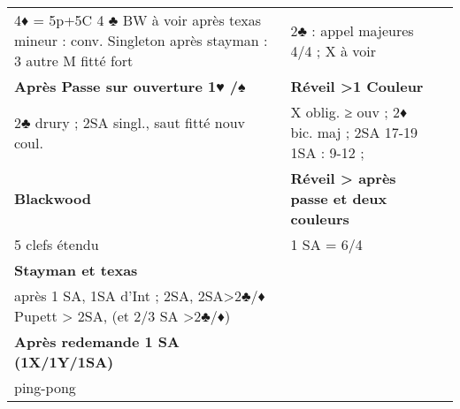 \documentclass[a5paper]{article}
\newcommand{\g}[1]{\textbf{#1}}
\begin{document}
{\begin{tabular}{p{}|p{}|p{}}
	4♦ = 5p+5C 4 ♣ BW à voir après texas mineur : conv. Singleton  après stayman : 3 autre M fitté fort & 2♣ : appel majeures 4/4 ; X à voir & \\
	\g{Après Passe sur ouverture 1♥ /♠} & \g{Réveil >1 Couleur} \\
	
	2♣ drury  ; 2SA singl., saut fitté nouv coul. & X oblig. ≥ ouv  ; 2♦ bic. maj ; 2SA 17-19 1SA : 9-12   ; & \\
	
	\g{Blackwood} & \g{Réveil > après passe et deux couleurs} \\
	
	5 clefs étendu & 1 SA = 6/4							 \\
	
	\g{Stayman et texas} \\
	après 1 SA, 1SA d'Int ; 2SA, 2SA>2♣/♦  Pupett > 2SA, (et 2/3 SA >2♣/♦) \\
	
	\g{Après redemande 1 SA (1X/1Y/1SA)} \\
	 
	ping-pong \\
	\end{tabular}
}
\end{document}
